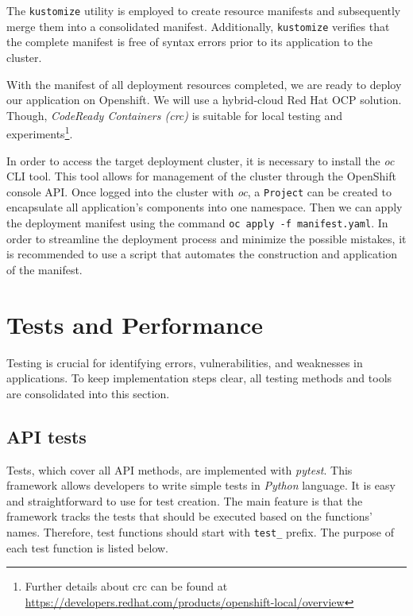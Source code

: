 The \texttt{kustomize} utility is employed to create resource manifests and subsequently merge them into a consolidated manifest. Additionally, \texttt{kustomize} verifies that the complete manifest is free of syntax errors prior to its application to the cluster. 

With the manifest of all deployment resources completed, we are ready to deploy our application on Openshift. We will use a hybrid-cloud Red Hat OCP solution. Though, \textit{CodeReady Containers (crc)} is suitable for local testing and experiments\footnote{Further details about crc can be found at \url{https://developers.redhat.com/products/openshift-local/overview}}.

In order to access the target deployment cluster, it is necessary to install the \textit{oc} CLI tool. This tool allows for management of the cluster through the OpenShift console API. Once logged into the cluster with \textit{oc}, a \texttt{Project} can be created to encapsulate all application's components into one namespace. Then we can apply the deployment manifest using the command \texttt{oc apply -f manifest.yaml}. In order to streamline the deployment process and minimize the possible mistakes, it is recommended to use a script that automates the construction and application of the manifest.

\section{Tests and Performance}
\label{sec:testing}

Testing is crucial for identifying errors, vulnerabilities, and weaknesses in applications. To keep implementation steps clear, all testing methods and tools are consolidated into this section.

\subsection*{API tests}

Tests, which cover all API methods, are implemented with \textit{pytest}. This framework allows developers to write simple tests in \textit{Python} language. It is easy and straightforward to use for test creation. The main feature is that the framework tracks the tests that should be executed based on the functions' names. Therefore, test functions should start with \texttt{test\_} prefix. The purpose of  each test function is listed below.

